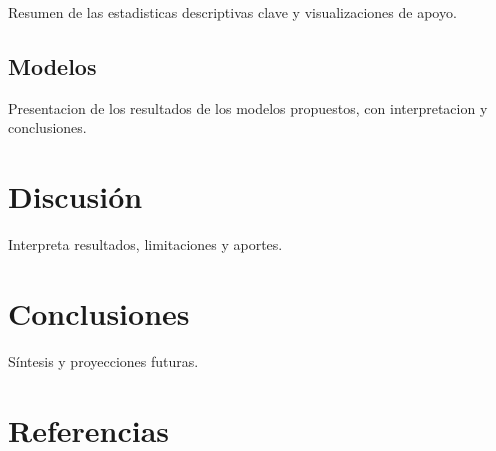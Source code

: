 \documentclass[
  spanish,
  a4paper,
  oneside]{scrbook}
\begin{document}
Resumen de las estadisticas descriptivas clave y visualizaciones de
apoyo.

\section{Modelos}\label{modelos}

Presentacion de los resultados de los modelos propuestos, con
interpretacion y conclusiones.


\chapter{Discusión}\label{discusiuxf3n}

Interpreta resultados, limitaciones y aportes.


\chapter{Conclusiones}\label{conclusiones}

Síntesis y proyecciones futuras.


\chapter{Referencias}\label{referencias}
\end{document}
